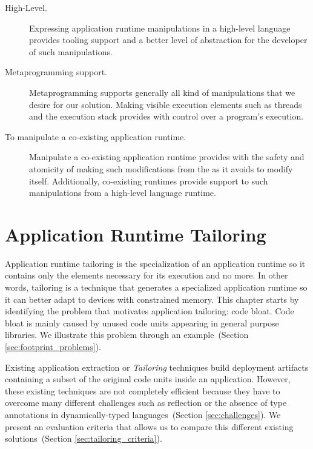 \begin{description}

\item[High-Level.] Expressing application runtime manipulations in a high-level language provides tooling support and a better level of abstraction for the developer of such manipulations. 

\item[Metaprogramming support.] Metaprogramming supports generally all kind of manipulations that we desire for our solution. Making visible execution elements such as threads and the execution stack provides with control over a program's execution.

\item[To manipulate a co-existing application runtime.] Manipulate a co-existing application runtime provides with the safety and atomicity of making such modifications from the \VM as it avoids to modify itself. Additionally, co-existing runtimes provide support to such manipulations from a high-level language runtime.

\end{description}


\chapter{Application Runtime Tailoring}
\minitoc

Application runtime tailoring is the specialization of an application runtime so it contains only the elements necessary for its execution and no more. In other words, tailoring is a technique that generates a specialized application runtime so it can better adapt to devices with constrained memory.
This chapter starts by identifying the problem that motivates application tailoring: code bloat. Code bloat is mainly caused by unused code units appearing in general purpose libraries.
We illustrate this problem through an example~(Section \ref{sec:footprint_problems}).

Existing application extraction or \emph{Tailoring} techniques build deployment artifacts containing a subset of the original code units inside an application. However, these existing techniques are not completely efficient because they have to overcome many different challenges such as reflection or the absence of type annotations in dynamically-typed languages~(Section \ref{sec:challenges}). We present an evaluation criteria that allows us to compare this different existing solutions~(Section \ref{sec:tailoring_criteria}).

